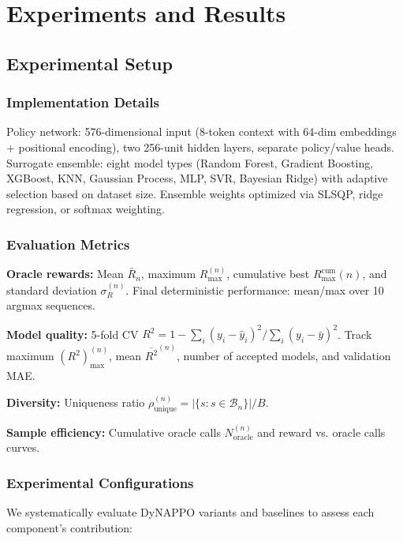 \documentclass[conference]{IEEEtran}
\begin{document}
\section{Experiments and Results}
\subsection{Experimental Setup}

\subsubsection{Implementation Details}

Policy network: 576-dimensional input (8-token context with 64-dim embeddings + positional encoding), two 256-unit hidden layers, separate policy/value heads. Surrogate ensemble: eight model types (Random Forest, Gradient Boosting, XGBoost, KNN, Gaussian Process, MLP, SVR, Bayesian Ridge) with adaptive selection based on dataset size. Ensemble weights optimized via SLSQP, ridge regression, or softmax weighting.

\subsubsection{Evaluation Metrics}

\textbf{Oracle rewards:} Mean $\bar{R}_n$, maximum $R_{\max}^{(n)}$, cumulative best $R_{\max}^{\text{cum}}(n)$, and standard deviation $\sigma_R^{(n)}$. Final deterministic performance: mean/max over 10 argmax sequences.

\textbf{Model quality:} 5-fold CV $R^2 = 1 - \sum_i(y_i - \hat{y}_i)^2/\sum_i(y_i - \bar{y})^2$. Track maximum $(R^2)_{\max}^{(n)}$, mean $\overline{R^2}^{(n)}$, number of accepted models, and validation MAE.

\textbf{Diversity:} Uniqueness ratio $\rho_{\text{unique}}^{(n)} = |\{s : s \in \mathcal{B}_n\}|/B$.

\textbf{Sample efficiency:} Cumulative oracle calls $N_{\text{oracle}}^{(n)}$ and reward vs. oracle calls curves.

\subsubsection{Experimental Configurations}

We systematically evaluate DyNAPPO variants and baselines to assess each component's contribution:
\end{document}
